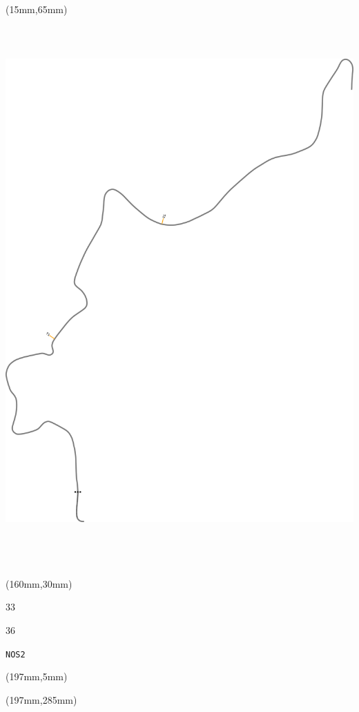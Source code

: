 \begin{textblock*}{185mm}(15mm,65mm)%
\centering
\mbox{\includegraphics[width=185mm,height=210mm,keepaspectratio]{PT/NOS2.pdf}}
\end{textblock*}
\begin{textblock*}{40mm}(160mm,30mm)%
\Large
\par{} 
\par33 
\par36 
\par\hfill\tiny\tt NOS2\\
\end{textblock*}
\begin{textblock*}{20mm}(197mm,5mm)%
\fbox{\thepage}
\label{NOS2}
\end{textblock*}
\begin{textblock*}{20mm}(197mm,285mm)%
\fbox{\thepage}
\end{textblock*}

